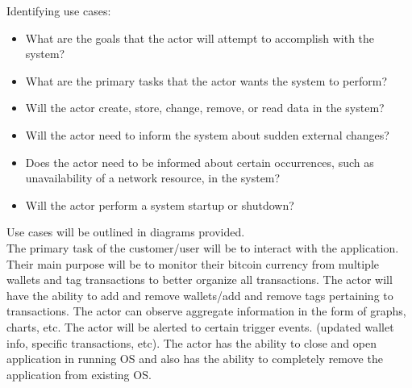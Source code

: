 Identifying use cases:\\
\begin{itemize}
\item What are the goals that the actor will attempt to accomplish with the system?
\item What are the primary tasks that the actor wants the system to perform?
\item Will the actor create, store, change, remove, or read data in the system?
\item Will the actor need to inform the system about sudden external changes?
\item Does the actor need to be informed about certain occurrences, such as unavailability of a network resource, in the system?
\item Will the actor perform a system startup or shutdown?
\end{itemize}

Use cases will be outlined in diagrams provided.\\ 

The primary task of the customer/user will be to interact with the application.  Their main purpose will be to monitor their bitcoin currency from multiple wallets and tag transactions to better organize all transactions.  The actor will have the ability to add and remove wallets/add and remove tags pertaining to transactions. The actor can observe aggregate information in the form of graphs, charts, etc.  The actor will be alerted to certain trigger events. (updated wallet info, specific transactions, etc).  The actor has the ability to close and open application in running OS and also has the ability to completely remove the application from existing OS. \\
	
	
